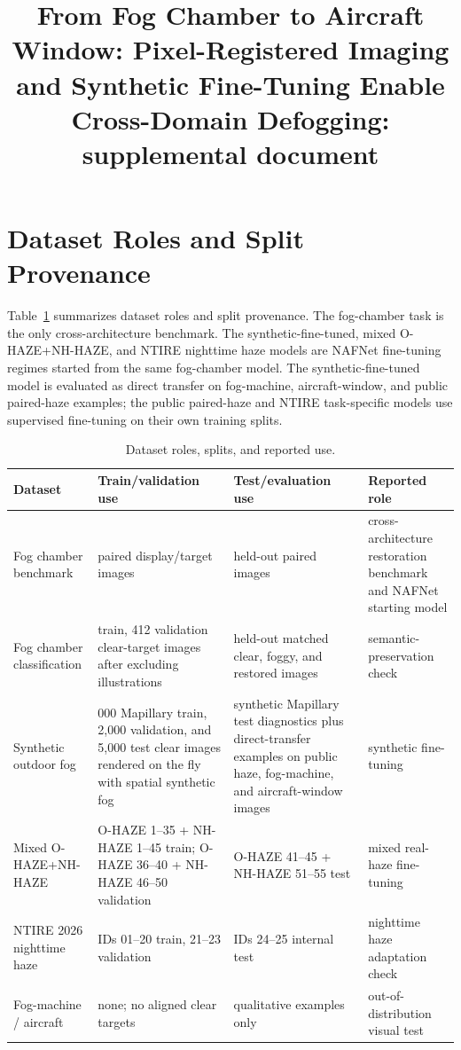 \documentclass[9pt]{osa-supplemental-document}
\title{From Fog Chamber to Aircraft Window: Pixel-Registered Imaging and Synthetic Fine-Tuning Enable Cross-Domain Defogging: supplemental document}
\author{} %
\begin{document}
\maketitle

\section{Dataset Roles and Split Provenance}

Table~\ref{tabS:dataset_roles} summarizes dataset roles and split provenance. The fog-chamber task is the only cross-architecture benchmark. The synthetic-fine-tuned, mixed O-HAZE+NH-HAZE, and NTIRE nighttime haze models are NAFNet fine-tuning regimes started from the same fog-chamber model. The synthetic-fine-tuned model is evaluated as direct transfer on fog-machine, aircraft-window, and public paired-haze examples; the public paired-haze and NTIRE task-specific models use supervised fine-tuning on their own training splits.

\begin{table}[H]
\centering
\footnotesize
\setlength{\tabcolsep}{4pt}
\renewcommand{\arraystretch}{1.15}
\caption{Dataset roles, splits, and reported use.}
\label{tabS:dataset_roles}
\begin{tabular}{@{}>{\raggedright\arraybackslash}p{}>{\raggedright\arraybackslash}p{}>{\raggedright\arraybackslash}p{}>{\raggedright\arraybackslash}p{}@{}}
\toprule
\textbf{Dataset} & \textbf{Train/validation use} & \textbf{Test/evaluation use} & \textbf{Reported role} \\
\midrule
Fog chamber benchmark & 4943 paired display/target images & 552 held-out paired images & cross-architecture restoration benchmark and NAFNet starting model \\
Fog chamber classification & 3708 train, 412 validation clear-target images after excluding illustrations & 460 held-out matched clear, foggy, and restored images & semantic-preservation check \\
Synthetic outdoor fog & 18{,}000 Mapillary train, 2{,}000 validation, and 5{,}000 test clear images rendered on the fly with spatial synthetic fog & synthetic Mapillary test diagnostics plus direct-transfer examples on public haze, fog-machine, and aircraft-window images & synthetic fine-tuning \\
Mixed O-HAZE+NH-HAZE & O-HAZE 1--35 + NH-HAZE 1--45 train; O-HAZE 36--40 + NH-HAZE 46--50 validation & O-HAZE 41--45 + NH-HAZE 51--55 test & mixed real-haze fine-tuning \\
NTIRE 2026 nighttime haze & IDs 01--20 train, 21--23 validation & IDs 24--25 internal test & nighttime haze adaptation check \\
Fog-machine / aircraft & none; no aligned clear targets & qualitative examples only & out-of-distribution visual test \\
\bottomrule
\end{tabular}
\end{table}
\FloatBarrier
\end{document}
